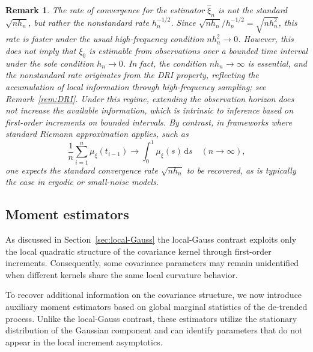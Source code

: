\documentclass[a4paper,10pt,twoside]{article}
\newtheorem{remark}{Remark}[section]
\numberwithin{equation}{section}
\begin{document}
\begin{remark}
The rate of convergence for the estimator $\widehat{\xi}_n$ is not the standard $\sqrt{n h_n}$, but rather the nonstandard rate $h_n^{-1/2}$.
Since $\sqrt{n h_n}/h_n^{-1/2} = \sqrt{n h_n^2}$, this rate is faster under the usual high-frequency condition $n h_n^2 \to 0$.
However, this does not imply that $\xi_0$ is estimable from observations over a bounded time interval under the sole condition $h_n \to 0$.
In fact, the condition $n h_n \to \infty$ is essential, and the nonstandard rate originates from the DRI property, reflecting the accumulation of local information through high-frequency sampling; see Remark~\ref{rem:DRI}.
Under this regime, extending the observation horizon does not increase the available information, which is intrinsic to inference based on first-order increments on bounded intervals.
By contrast, in frameworks where standard Riemann approximation applies, such as
\[
\frac{1}{n} \sum_{i=1}^n \mu_\xi(t_{i-1}) \to \int_0^1 \mu_\xi(s) \,\mathrm{d}s \quad (n \to \infty),
\]
one expects the standard convergence rate $\sqrt{n h_n}$ to be recovered, as is typically the case in ergodic or small-noise models.
\end{remark}


\subsection{Moment estimators}\label{sec:moment}
As discussed in Section~\ref{sec:local-Gauss} the local-Gauss contrast exploits only the local quadratic structure
of the covariance kernel through first-order increments.
Consequently, some covariance parameters may remain unidentified when different kernels share the same local curvature behavior.

To recover additional information on the covariance structure, we now introduce auxiliary moment estimators based on
global marginal statistics of the de-trended process.
Unlike the local-Gauss contrast, these estimators utilize the stationary distribution of the Gaussian component
and can identify parameters that do not appear in the local increment asymptotics.
\end{document}
